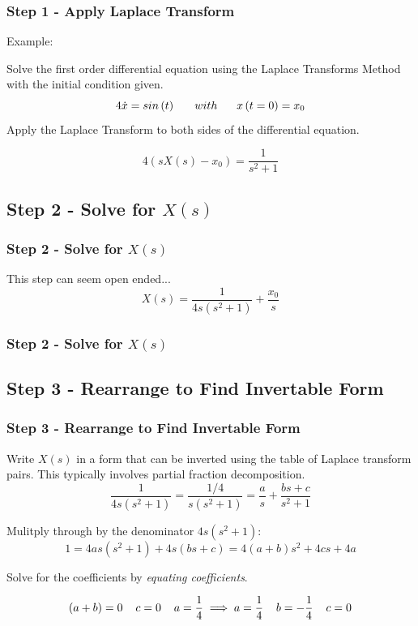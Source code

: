 \documentclass[fleqn]{beamer} %
\newcommand{\sectionIIsubsectionItitle}{Step 1 - Apply Laplace Transform}
\newcommand{\sectionIIsubsectionIItitle}{Step 2 - Solve for $X(s)$}
\newcommand{\sectionIIsubsectionIIItitle}{Step 3 - Rearrange to Find Invertable Form}
\begin{document}
			\begin{frame}[label=sectionIIsubsectionI]
				\frametitle{\sectionIIsubsectionItitle}
				\bigskip

				Example:

				Solve the first order differential equation using the Laplace Transforms Method with the initial condition given. 
				\[4\dot{x}=sin\left(t\right) \hspccc with \hspccc x\left(t=0\right)=x_0 \] 
				Apply the Laplace Transform to both sides of the differential equation. 

				\[ 4\left(sX\left(s \right)-x_0 \right)=\frac{1}{s^2+1} \]
				
				\btVFill
			\end{frame}


		\subsection{\sectionIIsubsectionIItitle}\label{sectionIIsubsectionII}

			\begin{frame}

				\frametitle{\sectionIIsubsectionIItitle}
				\bigskip

				This step can seem open ended...
				\[X(s)=\frac{1}{4s\left(s^2+1\right)}+\frac{x_0}{s} \] 
	
				\btVFill 
			\end{frame}

			\begin{frame}

				\frametitle{\sectionIIsubsectionIItitle}
				\bigskip



				\btVFill 
			\end{frame}




		\subsection{\sectionIIsubsectionIIItitle}\label{sectionIIsubsectionIII}

			\begin{frame}
				\frametitle{\sectionIIsubsectionIIItitle}
				\bigskip

				Write $X\left(s\right)$ in a form that can be inverted using the table of Laplace transform pairs. This typically involves partial fraction decomposition. 
				\[\frac{1}{4s\left(s^2+1 \right)}=\frac{1/4}{s\left(s^2+1\right)} =\frac{a}{s}+\frac{bs+c}{s^2+1} \] 

				Mulitply through by the denominator $4s\left(s^2+1\right)$:
				\[ 1=4as\left(s^2+1\right)+4s\left(bs+c\right)=4\left(a+b \right)s^2 + 4cs +4a \]

				Solve for the coefficients by {\it equating coefficients}.

				\[ \left( a+b\right)=0 \hspcc c=0 \hspcc a=\frac{1}{4} \implies a=\frac{1}{4} \hspcc b=-\frac{1}{4} \hspcc c=0 \]	
			
				\btVFill 
			\end{frame}	
\end{document}
